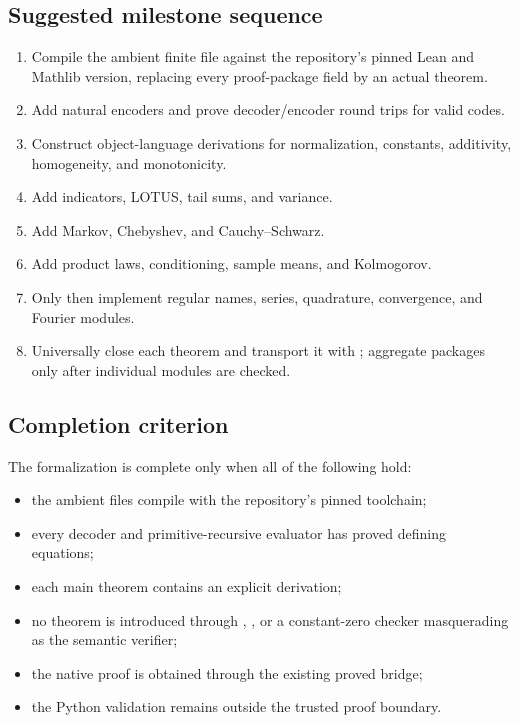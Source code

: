 \subsection{Suggested milestone sequence}

\begin{enumerate}
\item Compile the ambient finite file against the repository's pinned Lean and
  Mathlib version, replacing every proof-package field by an actual theorem.
\item Add natural encoders and prove decoder/encoder round trips for valid
  codes.
\item Construct object-language derivations for normalization, constants,
  additivity, homogeneity, and monotonicity.
\item Add indicators, LOTUS, tail sums, and variance.
\item Add Markov, Chebyshev, and Cauchy--Schwarz.
\item Add product laws, conditioning, sample means, and Kolmogorov.
\item Only then implement regular names, series, quadrature, convergence, and
  Fourier modules.
\item Universally close each theorem and transport it with
  ; aggregate packages only after individual modules are
  checked.
\end{enumerate}

\subsection{Completion criterion}

The formalization is complete only when all of the following hold:
\begin{itemize}
\item the ambient files compile with the repository's pinned toolchain;
\item every decoder and primitive-recursive evaluator has proved defining
  equations;
\item each main theorem contains an explicit  derivation;
\item no theorem is introduced through , , or a
  constant-zero checker masquerading as the semantic verifier;
\item the native proof is obtained through the existing proved bridge;
\item the Python validation remains outside the trusted proof boundary.
\end{itemize}
